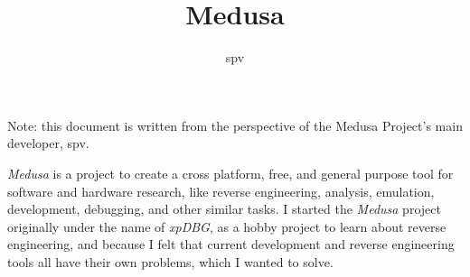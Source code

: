 \documentclass{article}
\title{Medusa}
\author{spv}
\begin{document}
	\maketitle

    Note: this document is written from the perspective of the Medusa Project's
    main developer, spv.

	\textit{Medusa} is a project to create a cross platform, free, and general
    purpose tool for software and hardware research, like reverse engineering,
    analysis, emulation, development, debugging, and other similar tasks. I
    started the \textit{Medusa} project originally under the name of
    \textit{xpDBG}, as a hobby project to learn about reverse engineering, and
    because I felt that current development and reverse engineering tools all
    have their own problems, which I wanted to solve.
\end{document}
